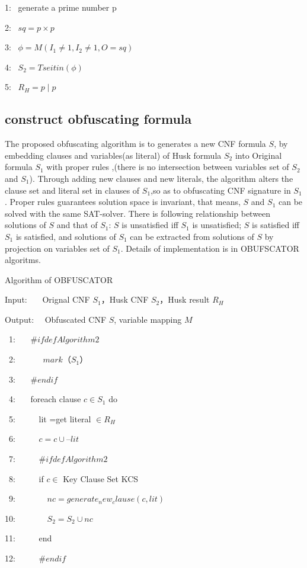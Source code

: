 \documentclass[runningheads,a4paper]{llncs}
\begin{document}
1:~ generate a prime number p

2:~ $sq=p\times p$

3:~ $\phi= M(I_1 \neq 1, I_2\neq 1, O=sq)$

4:~ $S_2=Tseitin(\phi)$

5:~ $R_H=p\mid p$

\subsection{construct obfuscating formula}

The proposed obfuscating algorithm is to generates a new CNF formula $S$, 
by embedding clauses and variables(as literal) of Husk formula $S_2$ into Original formula $S_1$ with proper rules ,(there is no intersection between variables set of $S_2$ and $S_1$). 
Through adding new clauses and new literals, the algorithm alters the clause set and literal set in clauses of $S_1$,so as to obfuscating CNF signature in $S_1$.
Proper rules guarantees solution space is invariant, that means, $S$ and $S_1$ can be solved with the same SAT-solver.
There is following relationship between solutions of $S$ and that of $S_1$: $S$ is unsatisfied iff $S_1$ is unsatisfied;
$S$ is satisfied iff $S_1$ is satisfied, and solutions of $S_1$ can be extracted from solutions of $S$ by projection on variables set of $S_1$.
Details of implementation is in OBUFSCATOR algoritms.

\noindent Algorithm of OBFUSCATOR

Input:~~~ Orignal CNF $S_1$，Husk CNF $S_2$，Husk result $R_H$

Output:~~ Obfuscated CNF $S$, variable mapping $M$ 

~1:~~~  $ \# ifdef Algorithm2$

~2:~~~~~~   $mark（S_1）$

~3:~~~  $ \# endif$

~4:~~~  foreach clause $c \in S_1$  do

~5:~~~~~      lit =get literal $ \in R_H$

~6:~~~~~      $c=c \cup –lit$

~7:~~~~~     $ \#ifdef Algorithm2$

~8:~~~~~         if  $c \in$  Key Clause Set KCS

~9:~~~~~~~           $nc=generate_new_clause(c,lit)$

10:~~~~~~~           $S_2=S_2 \cup nc$

11:~~~~~         end  

12:~~~~~     $ \# endif $
\end{document}
